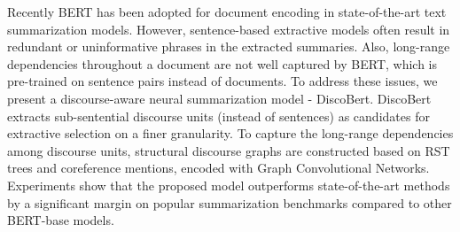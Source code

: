 Recently BERT has been adopted for document encoding in state-of-the-art text summarization models. However, sentence-based extractive models often result in redundant or uninformative phrases in the extracted summaries. Also, long-range dependencies throughout a document are not well captured by BERT, which is pre-trained on sentence pairs instead of documents. To address these issues, we present a discourse-aware neural summarization model - DiscoBert. DiscoBert extracts sub-sentential discourse units (instead of sentences) as candidates for extractive selection on a finer granularity. To capture the long-range dependencies among discourse units, structural discourse graphs are constructed based on RST trees and coreference mentions, encoded with Graph Convolutional Networks. Experiments show that the proposed model outperforms state-of-the-art methods by a significant margin on popular summarization benchmarks compared to other BERT-base models.
